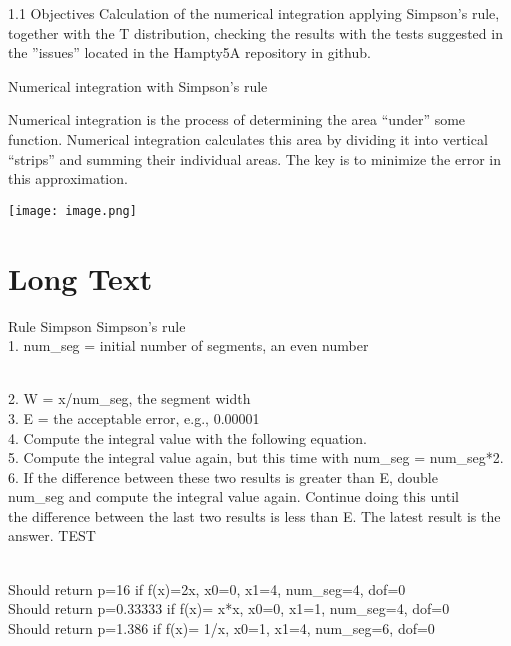 \documentclass{purdue-slide}
\title {\tiny }
\subtitle{\tiny Made with Jaime Ivan Avila Mu˜noz}
\author{}
\institute{Analysis and documentation of practice 5A:
Numerical integration with Simpson’s rule and
the t distribution}
\date{\today}
\begin{document}
\begin{titleframe}{}
    \maketitle
\end{titleframe}

\begin{titleframe}{\tiny 1.1 Objectives
Calculation of the numerical integration applying Simpson’s rule, together with
the T distribution, checking the results with the tests suggested in the ”issues”
located in the Hampty5A repository in github.}

{\tiny
Numerical integration with Simpson’s rule

Numerical integration is the process of determining the area
“under” some function.
Numerical integration calculates this area by dividing it into vertical
“strips” and summing their individual areas.
The key is to minimize the error in this approximation.}

\texttt{[image: image.png]}
   
\end{titleframe}

\section{Long Text}

\begin{frame}{\tiny Rule Simpson}
   \tiny Simpson’s rule
\\1. num_seg = initial number of segments, an even number

\\2. W = x/num_seg, the segment width
\\3. E = the acceptable error, e.g., 0.00001
\\4. Compute the integral value with the following equation.
\\5. Compute the integral value again, but this time with num_seg = num_seg*2.
\\6. If the difference between these two results is greater than E, double
\\num_seg and compute the integral value again. Continue doing this until
\\the difference between the last two results is less than E. The latest result is
the answer.
TEST

\\Should return p=16 if f(x)=2x, x0=0, x1=4, num_seg=4, dof=0
\\Should return p=0.33333 if f(x)= x*x, x0=0, x1=1, num_seg=4, dof=0
\\Should return p=1.386 if f(x)= 1/x, x0=1, x1=4, num_seg=6, dof=0

    \vspace{\baselineskip}
    
   
\end{frame}
\end{document}
